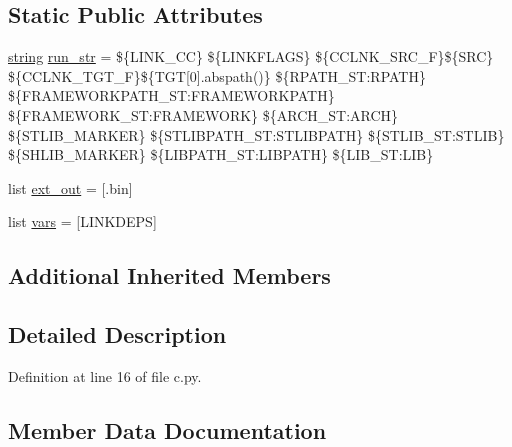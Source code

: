 \subsection*{Static Public Attributes}
\begin{DoxyCompactItemize}
\item 
\hyperlink{test__lib_f_l_a_c_2format_8c_ab02026ad0de9fb6c1b4233deb0a00c75}{string} \hyperlink{classwaflib_1_1_tools_1_1c_1_1cprogram_a4ac77c6e86bec9d784e54c25ef9bb030}{run\+\_\+str} = \textquotesingle{}\$\{L\+I\+N\+K\+\_\+\+CC\} \$\{L\+I\+N\+K\+F\+L\+A\+GS\} \$\{C\+C\+L\+N\+K\+\_\+\+S\+R\+C\+\_\+F\}\$\{S\+RC\} \$\{C\+C\+L\+N\+K\+\_\+\+T\+G\+T\+\_\+F\}\$\{T\+GT\mbox{[}0\mbox{]}.abspath()\} \$\{R\+P\+A\+T\+H\+\_\+\+S\+T\+:\+R\+P\+A\+TH\} \$\{F\+R\+A\+M\+E\+W\+O\+R\+K\+P\+A\+T\+H\+\_\+\+S\+T\+:\+F\+R\+A\+M\+E\+W\+O\+R\+K\+P\+A\+TH\} \$\{F\+R\+A\+M\+E\+W\+O\+R\+K\+\_\+\+S\+T\+:\+F\+R\+A\+M\+E\+W\+O\+RK\} \$\{A\+R\+C\+H\+\_\+\+S\+T\+:\+A\+R\+CH\} \$\{S\+T\+L\+I\+B\+\_\+\+M\+A\+R\+K\+ER\} \$\{S\+T\+L\+I\+B\+P\+A\+T\+H\+\_\+\+S\+T\+:\+S\+T\+L\+I\+B\+P\+A\+TH\} \$\{S\+T\+L\+I\+B\+\_\+\+S\+T\+:\+S\+T\+L\+IB\} \$\{S\+H\+L\+I\+B\+\_\+\+M\+A\+R\+K\+ER\} \$\{L\+I\+B\+P\+A\+T\+H\+\_\+\+S\+T\+:\+L\+I\+B\+P\+A\+TH\} \$\{L\+I\+B\+\_\+\+S\+T\+:\+L\+IB\}\textquotesingle{}
\item 
list \hyperlink{classwaflib_1_1_tools_1_1c_1_1cprogram_ab89e521669c2122dd0c3afef9c461341}{ext\+\_\+out} = \mbox{[}\textquotesingle{}.bin\textquotesingle{}\mbox{]}
\item 
list \hyperlink{classwaflib_1_1_tools_1_1c_1_1cprogram_ad645f538f3133d24a27b7819d06c5bed}{vars} = \mbox{[}\textquotesingle{}L\+I\+N\+K\+D\+E\+PS\textquotesingle{}\mbox{]}
\end{DoxyCompactItemize}
\subsection*{Additional Inherited Members}


\subsection{Detailed Description}


Definition at line 16 of file c.\+py.



\subsection{Member Data Documentation}
